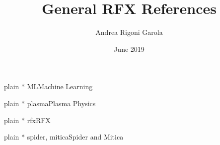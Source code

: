 \documentclass[9pt]{elsarticle}
\title{General RFX References}
\author{Andrea Rigoni Garola}
\date{June 2019}
\begin{document}
\maketitle

{plain}
\nocite{ML}{*}
{ML}{Machine Learning}

{plain}
\nocite{plasma}{*}
{plasma}{Plasma Physics}

{plain}
\nocite{rfx}{*}
{rfx}{RFX}

{plain}
\nocite{spider}{*}
{spider, mitica}{Spider and Mitica}
\end{document}
